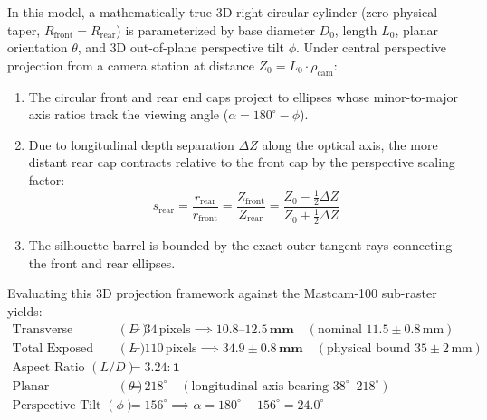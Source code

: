 \documentclass[11pt,a4paper]{article}
\begin{document}
In this model, a mathematically true 3D right circular cylinder (zero physical taper, $R_{\text{front}} = R_{\text{rear}}$) is parameterized by base diameter $D_0$, length $L_0$, planar orientation $\theta$, and 3D out-of-plane perspective tilt $\phi$. Under central perspective projection from a camera station at distance $Z_0 = L_0 \cdot \rho_{\text{cam}}$:
\begin{enumerate}
	\item The circular front and rear end caps project to ellipses whose minor-to-major axis ratios track the viewing angle ($\alpha = 180^\circ - \phi$).
	\item Due to longitudinal depth separation $\Delta Z$ along the optical axis, the more distant rear cap contracts relative to the front cap by the perspective scaling factor:
	\begin{equation}
		s_{\text{rear}} = \frac{r_{\text{rear}}}{r_{\text{front}}} = \frac{Z_{\text{front}}}{Z_{\text{rear}}} = \frac{Z_0 - \frac{1}{2}\Delta Z}{Z_0 + \frac{1}{2}\Delta Z}
	\end{equation}
	\item The silhouette barrel is bounded by the exact outer tangent rays connecting the front and rear ellipses.
\end{enumerate}

Evaluating this 3D projection framework against the Mastcam-100 sub-raster yields:
\begin{align}
	\text{Transverse Diameter } (D) & = 34\,\text{pixels} \implies \mathbf{10.8\text{--}12.5\,\text{mm}} \quad (\text{nominal } 11.5 \pm 0.8\,\text{mm}) \\
	\text{Total Exposed Length } (L) & = 110\,\text{pixels} \implies \mathbf{34.9 \pm 0.8\,\text{mm}} \quad (\text{physical bound } 35 \pm 2\,\text{mm}) \\
	\text{Aspect Ratio } (L / D) & = \mathbf{3.24 : 1} \\
	\text{Planar Orientation } (\theta) & = 218^\circ \quad (\text{longitudinal axis bearing } 38^\circ\text{--}218^\circ) \\
	\text{Perspective Tilt } (\phi) & = 156^\circ \implies \alpha = 180^\circ - 156^\circ = 24.0^\circ
\end{align}
\end{document}
